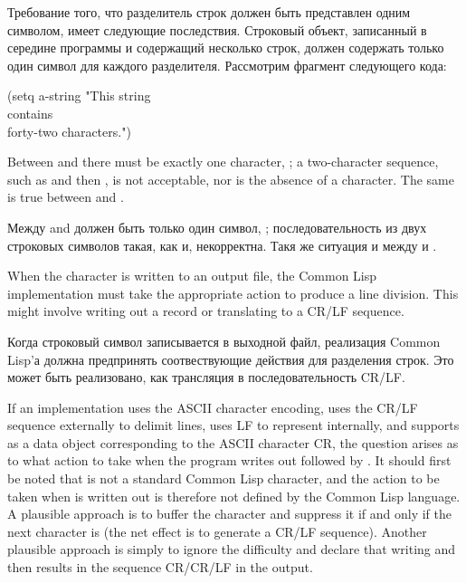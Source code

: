 Требование того, что разделитель строк должен быть представлен одним символом,
имеет следующие последствия. Строковый объект, записанный в середине программы и
содержащий несколько строк, должен содержать только один символ для каждого
разделителя. Рассмотрим фрагмент следующего кода:
\begin{lisp}
(setq a-string "This string \\
contains \\
forty-two characters.")
\end{lisp}
Between  and  there must be exactly one character,
; a two-character sequence, such as  and then
, is not acceptable, nor is the absence of a character.
The same is true between  and .

Между  and  должен быть только один символ,
; последовательность из двух строковых символов
такая, как  и,
некорректна.
Такя же ситуация и между  и .

When the character  is written to an output file,
the Common Lisp implementation must take the appropriate action
to produce a line division.  This might involve writing out a
record or translating  to a CR/LF sequence.

Когда строковый символ  записывается в выходной файл,
реализация Common Lisp'а должна предпринять соотвествующие действия для
разделения строк. Это может быть реализовано, как трансляция
 в последовательность CR/LF.

\beforenoterule
\begin{implementation}
If an implementation uses the ASCII character encoding,
uses the CR/LF sequence externally to delimit lines,
uses LF to represent  internally, and supports 
as a data object corresponding to the ASCII character CR, the
question arises as to what action to take when the program
writes out  followed by .
It should first be noted that  is not a standard Common Lisp
character, and the action to be taken when  is written out
is therefore not defined by the Common Lisp language.  A plausible approach
is to buffer the  character and suppress it if and only if the
next character is  (the net effect is to generate a CR/LF
sequence).
Another plausible
approach is simply to ignore
the difficulty and declare that writing  and then
 results in the sequence CR/CR/LF in the output.
\end{implementation}
\afternoterule

